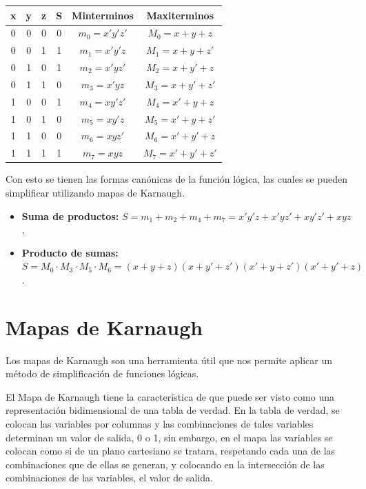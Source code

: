 \documentclass{article}
\begin{document}
\begin{table}[h]
    \centering
    \begin{tabular}{cccccc}
        \toprule
        \textbf{x} & \textbf{y} & \textbf{z} & \textbf{S} & \textbf{Minterminos} & \textbf{Maxiterminos}\\
        \midrule
        0 & 0 & 0 & 0 & $m_0 = x'y'z'$ & $M_0 = x+y+z$\\
        0 & 0 & 1 & 1 & $m_1 = x'y'z$ & $M_1 = x+y+z'$\\
        0 & 1 & 0 & 1 & $m_2 = x'yz'$ & $M_2 = x+y'+z$\\
        0 & 1 & 1 & 0 & $m_3 = x'yz$ & $M_3 = x+y'+z'$\\
        1 & 0 & 0 & 1 & $m_4 = xy'z'$ & $M_4 = x'+y+z$\\
        1 & 0 & 1 & 0 & $m_5 = xy'z$ & $M_5 = x'+y+z'$\\
        1 & 1 & 0 & 0 & $m_6 = xyz'$ & $M_6 = x'+y'+z$\\
        1 & 1 & 1 & 1 & $m_7 = xyz$ & $M_7 = x'+y'+z'$\\
        \bottomrule
    \end{tabular}
\end{table}

Con esto se tienen las formas canónicas de la función lógica, las cuales se pueden simplificar utilizando mapas de Karnaugh.
\begin{itemize}
    \item \textbf{Suma de productos:} $S = m_1 + m_2 + m_4 + m_7 = x'y'z + x'yz' + xy'z' + xyz$,
    \item \textbf{Producto de sumas:} $S = M_0 \cdot M_3 \cdot M_5 \cdot M_6 = (x+y+z)(x+y'+z')(x'+y+z')(x'+y'+z)$.
\end{itemize}


\newpage

\section*{Mapas de Karnaugh}

\begin{mdframed}[backgroundcolor=red!40,shadow=true,shadowsize=2pt,roundcorner=2pt]
    Los mapas de Karnaugh son una herramienta útil que nos permite aplicar un método de simplificación de funciones lógicas.
\end{mdframed}

El Mapa de Karnaugh tiene la característica de que puede ser visto como una representación bidimensional de una tabla de verdad. En la tabla de verdad, se colocan las variables por columnas y las combinaciones de tales variables determinan un valor de salida, 0 o 1, sin embargo, en el mapa las variables se colocan como si de un plano cartesiano se tratara, respetando cada una de las combinaciones que de ellas se generan, y colocando en la intersección de las combinaciones de las variables, el valor de salida.
\end{document}
